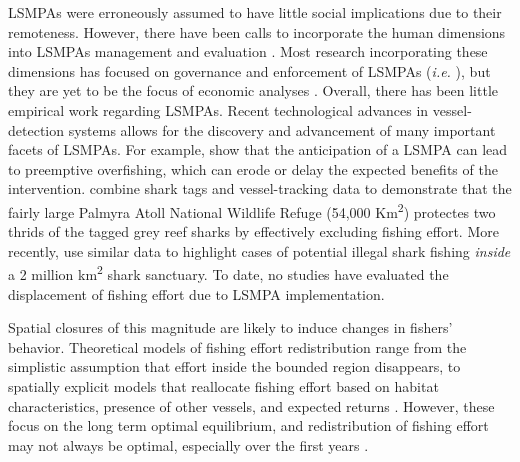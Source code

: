 \documentclass[11pt,]{article}
\begin{document}
LSMPAs were erroneously assumed to have little social implications due
to their remoteness. However, there have been calls to incorporate the
human dimensions into LSMPAs management and evaluation
\citep{agardy_2011,gray_2017}. Most research incorporating these
dimensions has focused on governance and enforcement of LSMPAs
(\emph{i.e.} \citet{alger_2017,christie_2017}), but they are yet to be
the focus of economic analyses \citep{gray_2017}. Overall, there has
been little empirical work regarding LSMPAs. Recent technological
advances in vessel-detection systems allows for the discovery and
advancement of many important facets of LSMPAs. For example,
\citep{mcdermott_2018} show that the anticipation of a LSMPA can lead to
preemptive overfishing, which can erode or delay the expected benefits
of the intervention. \citet{white_2017} combine shark tags and
vessel-tracking data to demonstrate that the fairly large Palmyra Atoll
National Wildlife Refuge (54,000 Km\textsuperscript{2}) protectes two
thrids of the tagged grey reef sharks by effectively excluding fishing
effort. More recently, \citep{bradley_2018} use similar data to
highlight cases of potential illegal shark fishing \emph{inside} a 2
million km\textsuperscript{2} shark sanctuary. To date, no studies have
evaluated the displacement of fishing effort due to LSMPA
implementation.

Spatial closures of this magnitude are likely to induce changes in
fishers' behavior. Theoretical models of fishing effort redistribution
range from the simplistic assumption that effort inside the bounded
region disappears, to spatially explicit models that reallocate fishing
effort based on habitat characteristics, presence of other vessels, and
expected returns \citep{smith_2003,hilborn_2006}. However, these focus
on the long term optimal equilibrium, and redistribution of fishing
effort may not always be optimal, especially over the first years
\citep{stevenson_2013}.
\end{document}
